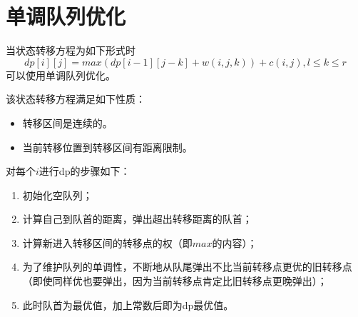 \section{单调队列优化}
当状态转移方程为如下形式时
\begin{displaymath}
    dp[i][j]=max(dp[i-1][j-k]+w(i,j,k))+c(i,j),l \leq k \leq r
\end{displaymath}
可以使用单调队列优化。

该状态转移方程满足如下性质：
\begin{itemize}
	\item 转移区间是连续的。
	\item 当前转移位置到转移区间有距离限制。
\end{itemize}

对每个$i$进行dp的步骤如下：
\begin{enumerate}
	\item 初始化空队列；
	\item 计算自己到队首的距离，弹出超出转移距离的队首；
	\item 计算新进入转移区间的转移点的权（即$max$的内容）；
	\item 为了维护队列的单调性，不断地从队尾弹出不比当前转移点更优的旧转移点
	      （即使同样优也要弹出，因为当前转移点肯定比旧转移点更晚弹出）；
	\item 此时队首为最优值，加上常数后即为dp最优值。
\end{enumerate}
